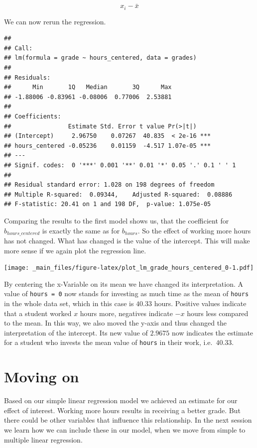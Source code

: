\documentclass[
]{book}
\begin{document}
\[x_i - \bar{x}\]

We can now rerun the regression.

\begin{verbatim}
## 
## Call:
## lm(formula = grade ~ hours_centered, data = grades)
## 
## Residuals:
##      Min       1Q   Median       3Q      Max 
## -1.88006 -0.83961 -0.08006  0.77006  2.53881 
## 
## Coefficients:
##                Estimate Std. Error t value Pr(>|t|)    
## (Intercept)     2.96750    0.07267  40.835  < 2e-16 ***
## hours_centered -0.05236    0.01159  -4.517 1.07e-05 ***
## ---
## Signif. codes:  0 '***' 0.001 '**' 0.01 '*' 0.05 '.' 0.1 ' ' 1
## 
## Residual standard error: 1.028 on 198 degrees of freedom
## Multiple R-squared:  0.09344,    Adjusted R-squared:  0.08886 
## F-statistic: 20.41 on 1 and 198 DF,  p-value: 1.075e-05
\end{verbatim}

Comparing the results to the first model shows us, that the coefficient for
\(b_{hours\_centered}\) is exactly the same as for \(b_{hours}\). So the effect
of working more hours has not changed. What has changed is the value of the
intercept. This will make more sense if we again plot the regression line.

\texttt{[image: \_main\_files/figure-latex/plot\_lm\_grade\_hours\_centered\_0-1.pdf]}

By centering the x-Variable on its mean we have changed its interpretation.
A value of \texttt{hours\ =\ 0} now stands for investing as much time as the mean
of \texttt{hours} in the whole data set, which in this case is \(40.33\) hours. Positive
values indicate that a student worked \(x\) hours more, negatives indicate \(-x\)
hours less compared to the mean. In this way, we also moved the y-axis and thus
changed the interpretation of the intercept. Its new value of \(2.9675\) now
indicates the estimate for a student who invests the mean value of \texttt{hours} in
their work, i.e.~\(40.33\).

\hypertarget{moving-on}{%
\section{Moving on}\label{moving-on}}

Based on our simple linear regression model we achieved an estimate for our
effect of interest. Working more hours results in receiving a better grade.
But there could be other variables that influence this relationship. In the
next session we learn how we can include these in our model, when we move from
simple to multiple linear regression.
\end{document}
